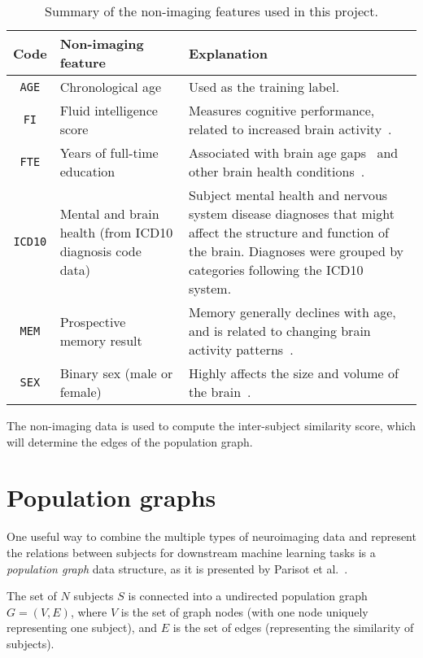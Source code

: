\begin{table}[]
    \caption{Summary of the non-imaging features used in this project.}\label{table:phenotype-features}
    \centering
    \begin{tabular}{cp{6cm}p{7.5cm}}
        \hline
    \textbf{Code} & \textbf{Non-imaging feature} & \textbf{Explanation} \\ \hline
    \texttt{AGE} & Chronological age &  Used as the training label. \\
    \texttt{FI} & Fluid intelligence score &  Measures cognitive performance, related to increased brain activity~\cite{gray2003neural}. \\
    \texttt{FTE} & Years of full-time education &  Associated with brain age gaps~\cite{steffener2016differences} and other brain health conditions~\cite{brayne2010education}.\\
    \texttt{ICD10} & Mental and brain health (from ICD10 diagnosis code data) & Subject mental health and nervous system disease diagnoses that might affect the structure and function of the brain. Diagnoses were grouped by categories following the ICD10 system. \\
    \texttt{MEM} & Prospective memory result & Memory generally declines with age, and is related to changing brain activity patterns~\cite{grady2000changes, kliegel2006delayed}. \\
    \texttt{SEX} & Binary sex (male or female) & Highly affects the size and volume of the brain~\cite{ruigrok2014meta}. \\
    \end{tabular}
\end{table}

The non-imaging data is used to compute the inter-subject similarity score, which will determine the edges of the population graph.

\section{Population graphs}
\label{population-graphs}

One useful way to combine the multiple types of neuroimaging data and represent the relations between subjects for downstream machine learning tasks is a \textit{population graph} data structure, as it is presented by Parisot et al.~\cite{parisot2018disease}.

The set of $N$ subjects $S$ is connected into a undirected population graph $G = (V, E)$, where $V$ is the set of graph nodes (with one node uniquely representing one subject), and $E$ is the set of edges (representing the similarity of subjects).

